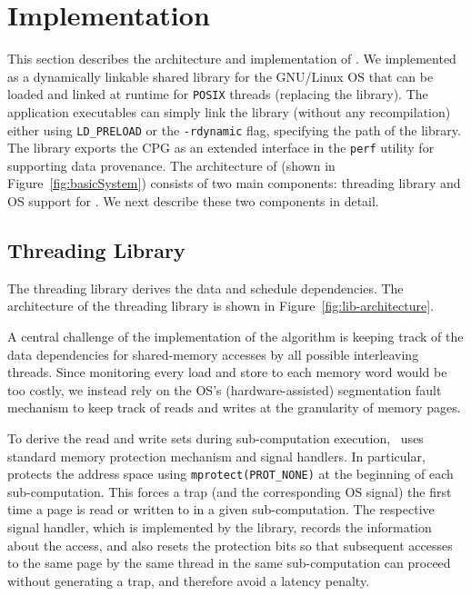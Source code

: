 \section{Implementation}
\label{sec:implementation}



This section describes the architecture and implementation of \projecttitle. We implemented \projecttitle as a dynamically linkable shared library for the GNU/Linux OS that can be loaded and linked  at runtime for {\tt POSIX} threads (replacing the \pthreads library). The application executables can simply link the library (without any recompilation) either using {\tt LD\_PRELOAD} or the {\tt -rdynamic} flag, specifying the path of the \projecttitle library.  The \projecttitle library exports the CPG as an extended interface in the {\tt perf} utility for supporting data provenance.   The architecture of \projecttitle (shown in Figure~\ref{fig:basicSystem}) consists of two main components: threading library and OS support for \intelpt. We next describe these two components in detail.




\subsection{Threading Library}
The threading library derives the data and schedule dependencies. The architecture of the threading library is shown in Figure~\ref{fig:lib-architecture}. 

 
 A central challenge of the implementation of the
algorithm is keeping track of the data dependencies for shared-memory accesses
by all possible interleaving threads. Since monitoring every load and store to
each memory word would be too costly, we instead rely on the OS's
(hardware-assisted) segmentation fault mechanism to keep track of reads and writes at the granularity of memory pages.

To derive the read and write sets during sub-computation execution,  \projecttitle~uses standard memory protection  mechanism and signal handlers. In particular, \projecttitle protects the address space using {\tt mprotect(PROT\_NONE)} at the beginning of each sub-computation. This forces a trap (and the corresponding OS signal) the first time a page is read or written to in a given sub-computation. The respective signal handler, which is implemented by the \projecttitle library, records the information about the access, and also resets the protection bits so that subsequent accesses to the same page by the same thread in the same sub-computation can proceed without generating a trap, and therefore avoid a
latency penalty.  

